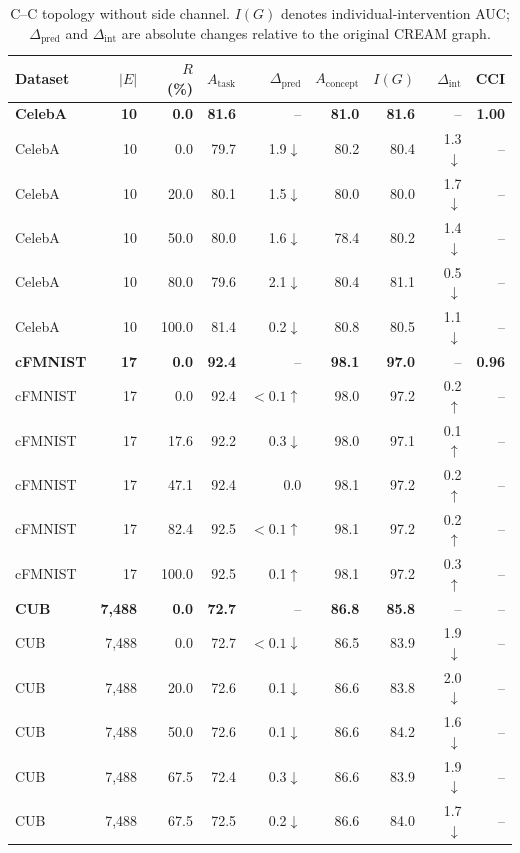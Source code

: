 \begin{table}[t]
\centering
\caption{C--C topology without side channel. $I(G)$ denotes individual-intervention AUC; $\Delta_{\mathrm{pred}}$ and $\Delta_{\mathrm{int}}$ are absolute changes relative to the original CREAM graph.}
\label{tab:cc_topology_no_side}
\small
\setlength{\tabcolsep}{6pt}
\begin{tabular}{lrrrrrrrr}
\toprule
Dataset & $|E|$ & $R$ (\%) & $A_{\mathrm{task}}$ & $\Delta_{\mathrm{pred}}$ & $A_{\mathrm{concept}}$ & $I(G)$ & $\Delta_{\mathrm{int}}$ & CCI \\
\midrule
\rowcolor{gray!15}
\textbf{CelebA} & \textbf{10} & \textbf{0.0} & \textbf{81.6} & -- & \textbf{81.0} & \textbf{81.6} & -- & \textbf{1.00} \\
CelebA & 10 & 0.0 & 79.7 & 1.9$\downarrow$ & 80.2 & 80.4 & 1.3$\downarrow$ & -- \\
CelebA & 10 & 20.0 & 80.1 & 1.5$\downarrow$ & 80.0 & 80.0 & 1.7$\downarrow$ & -- \\
CelebA & 10 & 50.0 & 80.0 & 1.6$\downarrow$ & 78.4 & 80.2 & 1.4$\downarrow$ & -- \\
CelebA & 10 & 80.0 & 79.6 & 2.1$\downarrow$ & 80.4 & 81.1 & 0.5$\downarrow$ & -- \\
CelebA & 10 & 100.0 & 81.4 & 0.2$\downarrow$ & 80.8 & 80.5 & 1.1$\downarrow$ & -- \\
\midrule
\rowcolor{gray!15}
\textbf{cFMNIST} & \textbf{17} & \textbf{0.0} & \textbf{92.4} & -- & \textbf{98.1} & \textbf{97.0} & -- & \textbf{0.96} \\
cFMNIST & 17 & 0.0 & 92.4 & $<0.1\uparrow$ & 98.0 & 97.2 & 0.2$\uparrow$ & -- \\
cFMNIST & 17 & 17.6 & 92.2 & 0.3$\downarrow$ & 98.0 & 97.1 & 0.1$\uparrow$ & -- \\
cFMNIST & 17 & 47.1 & 92.4 & 0.0 & 98.1 & 97.2 & 0.2$\uparrow$ & -- \\
cFMNIST & 17 & 82.4 & 92.5 & $<0.1\uparrow$ & 98.1 & 97.2 & 0.2$\uparrow$ & -- \\
cFMNIST & 17 & 100.0 & 92.5 & 0.1$\uparrow$ & 98.1 & 97.2 & 0.3$\uparrow$ & -- \\
\midrule
\rowcolor{gray!15}
\textbf{CUB} & \textbf{7,488} & \textbf{0.0} & \textbf{72.7} & -- & \textbf{86.8} & \textbf{85.8} & -- & -- \\
CUB & 7,488 & 0.0 & 72.7 & $<0.1\downarrow$ & 86.5 & 83.9 & 1.9$\downarrow$ & -- \\
CUB & 7,488 & 20.0 & 72.6 & 0.1$\downarrow$ & 86.6 & 83.8 & 2.0$\downarrow$ & -- \\
CUB & 7,488 & 50.0 & 72.6 & 0.1$\downarrow$ & 86.6 & 84.2 & 1.6$\downarrow$ & -- \\
CUB & 7,488 & 67.5 & 72.4 & 0.3$\downarrow$ & 86.6 & 83.9 & 1.9$\downarrow$ & -- \\
CUB & 7,488 & 67.5 & 72.5 & 0.2$\downarrow$ & 86.6 & 84.0 & 1.7$\downarrow$ & -- \\
\bottomrule
\end{tabular}
\end{table}
